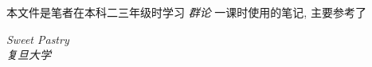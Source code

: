     本文件是笔者在本科二三年级时学习 \emph{群论} 一课时使用的笔记, 主要参考了 

    \begin{flushright}
        \textit{Sweet Pastry} \\[1em]
        \textit{复旦大学}
    \end{flushright}